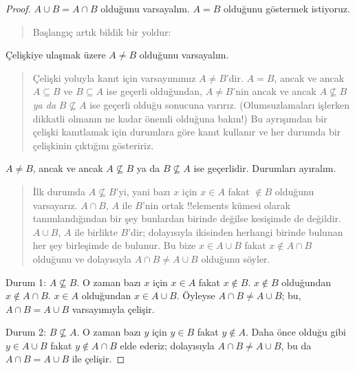 \documentclass[../../../include/open-logic-section]{subfiles}
\begin{document}
\begin{proof}
  $A \cup B = A \cap B$ olduğunu varsayalım. $A = B$ olduğunu göstermek
  istiyoruz.
  \begin{quote}
    Başlangıç artık bildik bir yoldur:
  \end{quote}
  Çelişkiye ulaşmak üzere $A \neq B$ olduğunu varsayalım.
  \begin{quote}
    Çelişki yoluyla kanıt için varsayımımız $A \neq B$'dir. $A = B$,
    ancak ve ancak $A \subseteq B$ ve $B \subseteq A$ ise geçerli
    olduğundan, $A \neq B$'nin ancak ve ancak $A \nsubseteq B$ \emph{ya
    da} $B \nsubseteq A$ ise geçerli olduğu sonucuna varırız.
    (Olumsuzlamaları işlerken dikkatli olmanın ne kadar önemli olduğuna
    bakın!{}) Bu ayrışımdan bir çelişki kanıtlamak için durumlara göre
    kanıt kullanır ve her durumda bir çelişkinin çıktığını gösteririz.
  \end{quote}
  $A \neq B$, ancak ve ancak $A \nsubseteq B$ ya da $B \nsubseteq A$
  ise geçerlidir. Durumları ayıralım.
  \begin{quote}
    İlk durumda $A \nsubseteq B$'yi, yani bazı $x$ için $x \in A$ fakat
    $\notin B$ olduğunu varsayarız. $A \cap B$, $A$ ile $B$'nin ortak
    !!{element}s kümesi olarak tanımlandığından bir şey bunlardan birinde
    değilse kesişimde de değildir. $A \cup B$, $A$ ile birlikte $B$'dir;
    dolayısıyla ikisinden herhangi birinde bulunan her şey birleşimde
    de bulunur. Bu bize $x \in A \cup B$ fakat $x \notin A \cap B$
    olduğunu ve dolayısıyla $A \cap B \neq A \cup B$ olduğunu söyler.
  \end{quote}

  Durum 1: $A \nsubseteq B$. O zaman bazı $x$ için $x \in A$ fakat $x
  \notin B$. $x \notin B$ olduğundan $x \notin A \cap B$. $x \in A$
  olduğundan $x \in A \cup B$. Öyleyse $A \cap B \neq A \cup B$;
  bu, $A \cap B = A \cup B$ varsayımıyla çelişir.

  Durum 2: $B \nsubseteq A$. O zaman bazı $y$ için $y \in B$ fakat $y
  \notin A$. Daha önce olduğu gibi $y \in A \cup B$ fakat $y \notin A
  \cap B$ elde ederiz; dolayısıyla $A \cap B \neq A \cup B$, bu da $A
  \cap B = A \cup B$ ile çelişir.
\end{proof}
\end{document}

